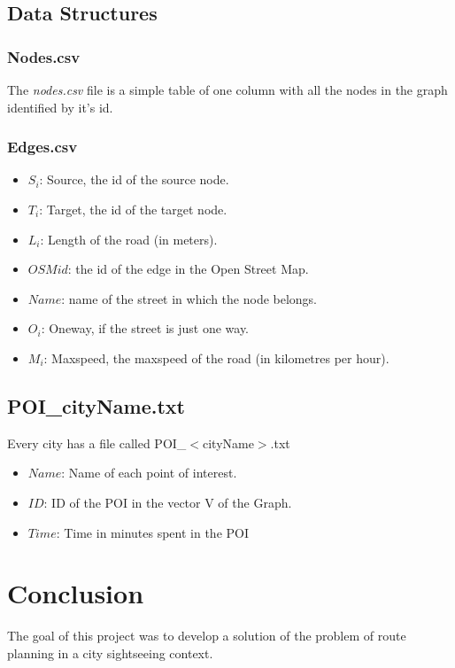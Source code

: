 \documentclass{article}
\begin{document}
\newpage
\subsection*{Data Structures}
\subsubsection*{Nodes.csv}
The \textit{nodes.csv} file is a simple table of one column with all the nodes in the graph identified by it's id. 

\subsubsection*{Edges.csv}
\begin{itemize}
    \item $S_i$: Source, the id of the source node. 
    \item $T_i$: Target, the id of the target node. 
    \item $L_i$: Length of the road (in meters).
    \item $OSM id$: the id of the edge in the Open Street Map. 
    \item $Name$: name of the street in which the node belongs.
    \item $O_i$: Oneway, if the street is just one way.
    \item $M_i$: Maxspeed, the maxspeed of the road (in kilometres per hour).
\end{itemize}

\subsection*{POI\_cityName.txt}
Every city has a file called POI\_$<$cityName$>$.txt
\begin{itemize}
    \item $Name$: Name of each point of interest.
    \item $ID$: ID of the POI in the vector V of the Graph.
    \item $Time$: Time in minutes spent in the POI
\end{itemize}

\section*{Conclusion} 

The goal of this project was to develop a solution of the problem of route planning in a city sightseeing context. \par
\end{document}

